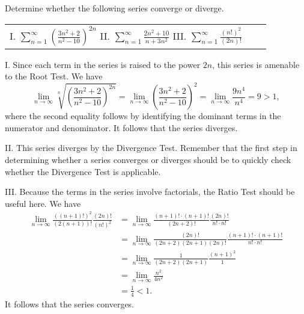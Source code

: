 \documentclass[]{ximera}
\begin{document}
\begin{problem}
Determine whether the following series converge or diverge.
\begin{center}
\begin{tabular}{lll}
I. $\sum_{n=1}^\infty \left(\frac{3n^2+2}{n^2-10}\right)^{2n}$ \hspace{.3in} II. $\sum_{n=1}^\infty \frac{2n^2+10}{n+3n^2}$ \hspace{.3in} III. $\sum_{n=1}^\infty \frac{(n!)^2}{(2n)!}$
\end{tabular}
\end{center}

\begin{solution}
I. Since each term in the series is raised to the power $2n$, this series is amenable to the Root Test. We have 
$$
\lim_{n \rightarrow \infty} \sqrt[n]{\left(\frac{3n^2+2}{n^2-10}\right)^{2n}} = \lim_{n \rightarrow \infty} \left(\frac{3n^2+2}{n^2-10}\right)^{2} = \lim_{n \rightarrow \infty} \frac{9 n^4}{n^4} = 9 > 1,
$$
where the second equality follows by identifying the dominant terms in the numerator and denominator. It follows that the series diverges.

II. This series diverges by the Divergence Test. Remember that the first step in determining whether a series converges or diverges should be to quickly check whether the Divergence Test is applicable.

III. Because the terms in the series involve factorials, the Ratio Test should be useful here. We have 
\begin{align*}
\lim_{n \rightarrow \infty} \frac{((n+1)!)^2}{(2(n+1))!} \frac{(2n)!}{(n!)^2} &= \lim_{n \rightarrow \infty} \frac{(n+1)! \cdot (n+1)!}{(2n+2)!} \frac{(2n)!}{n! \cdot n!} \\
&= \lim_{n \rightarrow \infty} \frac{(2n)!}{(2n+2)(2n+1)(2n)!} \frac{(n+1)! \cdot (n+1)!}{n! \cdot n!} \\
&= \lim_{n \rightarrow \infty} \frac{1}{(2n+2)(2n+1)} \frac{(n+1)^2}{1} \\
&= \lim_{n \rightarrow \infty} \frac{n^2}{4n^2} \\
&= \frac{1}{4} < 1.
\end{align*}
It follows that the series converges.
\end{solution}
\end{problem}
\end{document}
